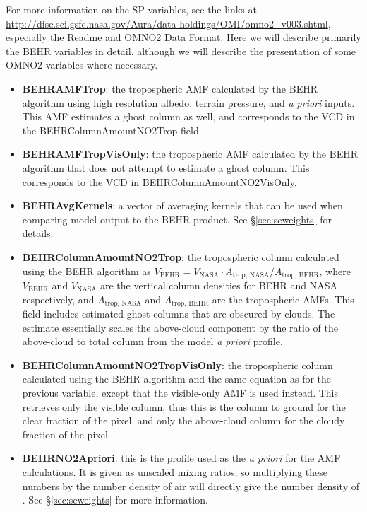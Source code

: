 \documentclass[12pt]{article}
\begin{document}
	For more information on the SP variables, see the links at \url{http://disc.sci.gsfc.nasa.gov/Aura/data-holdings/OMI/omno2_v003.shtml}, especially the Readme and OMNO2 Data Format.  Here we will describe primarily the BEHR variables in detail, although we will describe the presentation of some OMNO2 variables where necessary.
	
	\begin{itemize}
	\item \textbf{BEHRAMFTrop}: the tropospheric AMF calculated by the BEHR algorithm using high resolution albedo, terrain pressure, and  \emph{a priori} inputs.  This AMF estimates a ghost column as well, and corresponds to the VCD in the BEHRColumnAmountNO2Trop field.
	
	\item \textbf{BEHRAMFTropVisOnly}: the tropospheric AMF calculated by the BEHR algorithm that does not attempt to estimate a ghost column. This corresponds to the VCD in BEHRColumnAmountNO2VisOnly.
	
	\item \textbf{BEHRAvgKernels}: a vector of averaging kernels that can be used when comparing model output to the BEHR product. See \S\ref{sec:scweights} for details.
	
	\item \textbf{BEHRColumnAmountNO2Trop}: the tropospheric  column calculated using the BEHR algorithm as $V_{\mathrm{BEHR}} = V_{\mathrm{NASA}} \cdot A_{\text{trop, NASA}} / A_{\text{trop, BEHR}}$, where $V_{\mathrm{BEHR}}$ and $V_{\mathrm{NASA}}$ are the vertical column densities for BEHR and NASA respectively, and $A_{\text{trop, NASA}}$ and $A_{\text{trop, BEHR}}$ are the tropospheric AMFs.  This field includes estimated ghost columns that are obscured by clouds. The estimate essentially scales the above-cloud component by the ratio of the above-cloud to total column from the model \emph{a priori} profile.
	
	\item \textbf{BEHRColumnAmountNO2TropVisOnly}: the tropospheric  column calculated using the BEHR algorithm and the same equation as for the previous variable, except that the visible-only AMF is used instead. This retrieves only the visible  column, thus this is the  column to ground for the clear fraction of the pixel, and only the above-cloud  column for the cloudy fraction of the pixel.
	
	\item \textbf{BEHRNO2Apriori}: this is the  profile used as the \emph{a priori} for the AMF calculations. It is given as unscaled mixing ratios; so multiplying these numbers by the number density of air will directly give the number density of . See \S\ref{sec:scweights} for more information.
	

\end{itemize}
\end{document}
